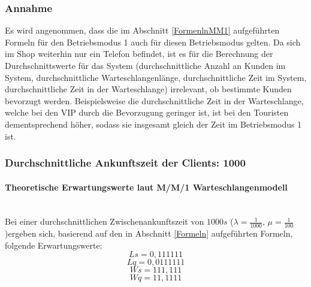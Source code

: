 \subsubsection{Annahme}
Es wird angenommen, dass die im Abschnitt \ref{FormenlnMM1} aufgeführten Formeln für den Betriebsmodus 1 auch für diesen Betriebsmodus gelten. Da sich im Shop weiterhin nur ein Telefon befindet, ist es für die Berechnung der Durchschnittswerte für das System (durchschnittliche Anzahl an Kunden im System, durchschnittliche Warteschlangenlänge, durchschnittliche Zeit im System, durchschnittliche Zeit in der Warteschlange) irrelevant, ob bestimmte Kunden bevorzugt werden. Beispielsweise die durchschnittliche Zeit in der Warteschlange, welche bei den VIP durch die Bevorzugung geringer ist, ist bei den Touristen dementsprechend höher, sodass sie insgesamt gleich der Zeit im Betriebsmodus 1 ist. 
\subsubsection{Durchschnittliche Ankunftszeit der Clients: 1000}
\paragraph{Theoretische Erwartungswerte laut M/M/1 Warteschlangenmodell}
\\
Bei einer durchschnittlichen Zwischenankunftszeit von $1000s$ ($\lambda=\frac{1}{1000}$, $\mu=\frac{1}{100}$)ergeben sich, basierend auf den in Abschnitt \ref{Formeln} aufgeführten Formeln, folgende Erwartungswerte:
\begin{equation}
Ls=0,111111
\end{equation}
\begin{equation}
Lq=0,0111111
\end{equation}
\begin{equation}
Ws=111,111
\end{equation}
\begin{equation}
Wq=11,1111
\end{equation}
